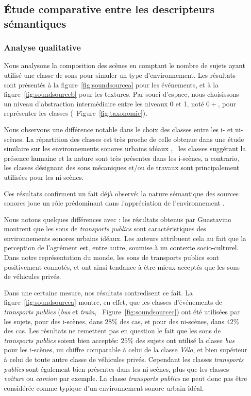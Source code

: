 \subsection[Descripteurs sémantiques]{Étude comparative entre les descripteurs sémantiques}

\subsubsection{Analyse qualitative}
\label{sec:ch5_anaQualiSem}

Nous analysons la composition des scènes en comptant le nombre de sujets ayant utilisé une classe de sons pour simuler un type d'environnement. Les résultats sont présentés à la figure~\ref{fig:soundsourcea} pour les événements, et à la figure~\ref{fig:soundsourceb} pour les textures. Par souci d'espace, nous choisissons un niveau d'abstraction intermédiaire entre les niveaux 0 et 1, noté $0+$, pour représenter les classes (\cf~Figure~\ref{fig:taxonomie}).

Nous observons une différence notable dans le choix des classes entre les i- et ni-scènes. La répartition des classes est très proche de celle obtenue dans une étude similaire sur les environnements sonores urbains idéaux \citep{guastavino2006ideal}, \ie~les classes suggérant la présence humaine et la nature sont très présentes dans les i-scènes, a contrario, les classes désignant des sons mécaniques et/ou de travaux sont principalement utilisées pour les ni-scènes.

Ces résultats confirment un fait déjà observé: la nature sémantique des sources sonores joue un rôle prédominant dans l'appréciation de l'environnement \citep{raimbault2005urban,dubois2006cognitive}.

Nous notons quelques différences avec \citep{guastavino2006ideal}: les résultats obtenus par Guastavino montrent que les sons de \emph{transports publics} sont caractéristiques des environnements sonores urbains idéaux. Les auteurs attribuent cela au fait que la perception de l'agrément est, entre autre, soumise à un contexte socio-culturel. Dans notre représentation du monde, les sons de transports publics sont positivement connotés, et ont ainsi tendance à être mieux acceptés que les sons de véhicules privés.

Dans une certaine mesure, nos résultats contredisent ce fait. La figure~\ref{fig:soundsourcea} montre, en effet, que les classes d'événements de \emph{transports publics} (\emph{bus} et \emph{train}, \cf~Figure~\ref{fig:soundsourcec}) ont été utilisées par les sujets, pour des i-scènes, dans $28\%$ des cas, et pour des ni-scènes, dans $42\%$ des cas. Les résultats ne remettent pas en question le fait que les sons de \emph{transports publics} soient bien acceptés: $25\%$ des sujets ont utilisé la classe \emph{bus} pour les i-scènes, un chiffre comparable à celui de la classe \emph{Vélo}, et bien supérieur à celui de toute autre classe de véhicules privés. Cependant les classes \emph{transports publics} sont également bien présentes dans les ni-scènes, plus que les classes \emph{voiture} ou \emph{camion} par exemple. La classe \emph{transports publics} ne peut donc pas être considérée comme typique d'un environnement sonore urbain idéal.

